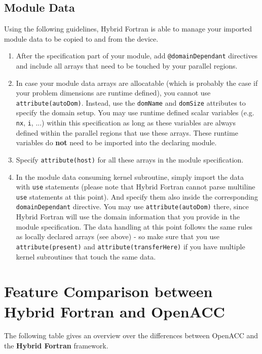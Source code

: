 \subsection{Module Data}
Using the following guidelines, Hybrid Fortran is able to manage your imported module data to be copied to and from the device.
\begin{enumerate}
 \item After the specification part of your module, add \verb|@domainDependant| directives and include all arrays that need to be touched by your parallel regions.
 \item In case your module data arrays are allocatable (which is probably the case if your problem dimensions are runtime defined), you cannot use \verb|attribute(autoDom)|. Instead, use the \verb|domName| and \verb|domSize| attributes to specify the domain setup. You may use runtime defined scalar variables (e.g. \verb|nx|, \verb|i|, ...) within this specification as long as these variables are always defined within the parallel regions that use these arrays. These runtime variables do \textbf{not} need to be imported into the declaring module.
 \item Specify \verb|attribute(host)| for all these arrays in the module specification.
 \item In the module data consuming kernel subroutine, simply import the data with \verb|use| statements (please note that Hybrid Fortran cannot parse multiline \verb|use| statements at this point). And specify them also inside the corresponding \verb|domainDependant| directive. You may use \verb|attribute(autoDom)| there, since Hybrid Fortran will use the domain information that you provide in the module specification. The data handling at this point follows the same rules as locally declared arrays (see above) - so make sure that you use \verb|attribute(present)| and \verb|attribute(transferHere)| if you have multiple kernel subroutines that touch the same data.
\end{enumerate}

\clearpage
\section{Feature Comparison between Hybrid Fortran and OpenACC} \label{sec:featureComparisonFrameworks}

The following table gives an overview over the differences between OpenACC and the \textbf{Hybrid Fortran} framework.

